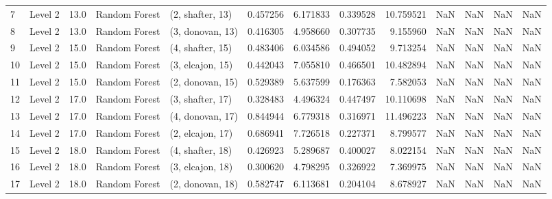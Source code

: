 \begin{tabular}{llrllrrrrrrrr}
7  &   Level 2 &   13.0 &  Random Forest &  (2, shafter, 13) &   0.457256 &   6.171833 &  0.339528 &  10.759521 &                  NaN &                    NaN &                 NaN &                   NaN \\
8  &   Level 2 &   13.0 &  Random Forest &  (3, donovan, 13) &   0.416305 &   4.958660 &  0.307735 &   9.155960 &                  NaN &                    NaN &                 NaN &                   NaN \\
9  &   Level 2 &   15.0 &  Random Forest &  (4, shafter, 15) &   0.483406 &   6.034586 &  0.494052 &   9.713254 &                  NaN &                    NaN &                 NaN &                   NaN \\
10 &   Level 2 &   15.0 &  Random Forest &  (3, elcajon, 15) &   0.442043 &   7.055810 &  0.466501 &  10.482894 &                  NaN &                    NaN &                 NaN &                   NaN \\
11 &   Level 2 &   15.0 &  Random Forest &  (2, donovan, 15) &   0.529389 &   5.637599 &  0.176363 &   7.582053 &                  NaN &                    NaN &                 NaN &                   NaN \\
12 &   Level 2 &   17.0 &  Random Forest &  (3, shafter, 17) &   0.328483 &   4.496324 &  0.447497 &  10.110698 &                  NaN &                    NaN &                 NaN &                   NaN \\
13 &   Level 2 &   17.0 &  Random Forest &  (4, donovan, 17) &   0.844944 &   6.779318 &  0.316971 &  11.496223 &                  NaN &                    NaN &                 NaN &                   NaN \\
14 &   Level 2 &   17.0 &  Random Forest &  (2, elcajon, 17) &   0.686941 &   7.726518 &  0.227371 &   8.799577 &                  NaN &                    NaN &                 NaN &                   NaN \\
15 &   Level 2 &   18.0 &  Random Forest &  (4, shafter, 18) &   0.426923 &   5.289687 &  0.400027 &   8.022154 &                  NaN &                    NaN &                 NaN &                   NaN \\
16 &   Level 2 &   18.0 &  Random Forest &  (3, elcajon, 18) &   0.300620 &   4.798295 &  0.326922 &   7.369975 &                  NaN &                    NaN &                 NaN &                   NaN \\
17 &   Level 2 &   18.0 &  Random Forest &  (2, donovan, 18) &   0.582747 &   6.113681 &  0.204104 &   8.678927 &                  NaN &                    NaN &                 NaN &                   NaN \\

\end{tabular}
